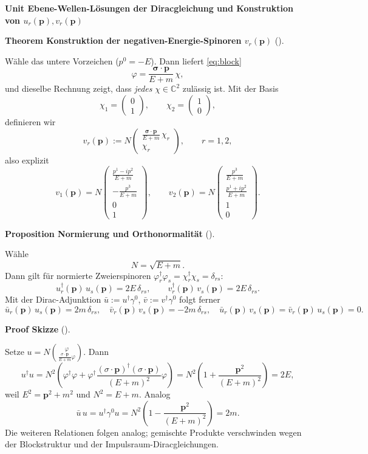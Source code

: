 \documentclass[10pt, letterpaper]{article}
\newcommand{\C}{\mathbb{C}}
\newcommand{\CustomHeading}[3]{%
  \par\medskip\noindent%
  \textbf{#1 #2} \textnormal{(#3)}.\enskip%
}
\newenvironment{PROP}[2]{\begin{unitbox}\CustomHeading{Proposition}{#1}{#2}}{\end{unitbox}}
\newenvironment{THEO}[2]{\begin{unitbox}\CustomHeading{Theorem}{#1}{#2}}{\end{unitbox}}
\newenvironment{PROOF}[2]{\begin{unitbox}\CustomHeading{Proof}{#1}{#2}}{\end{unitbox}}
\newenvironment{unit}[1]
  {\begin{unitbox}\textbf{Unit #1}\par\smallskip}
  {\end{unitbox}}
\begin{document}
\begin{unit}{Ebene-Wellen-Lösungen der Diracgleichung und Konstruktion von $u_r(\mathbf p),v_r(\mathbf p)$}
\begin{THEO}{Konstruktion der negativen-Energie-Spinoren $v_r(\mathbf p)$}{}
Wähle das untere Vorzeichen ($p^0=-E$). Dann liefert \eqref{eq:block}
\[
\varphi=\frac{\boldsymbol{\sigma}\!\cdot\!\mathbf p}{E+m}\,\chi,
\]
und dieselbe Rechnung zeigt, dass \emph{jedes} $\chi\in\C^2$ zulässig ist. Mit der Basis
\[
\chi_1=\begin{pmatrix}0\\1\end{pmatrix},\qquad
\chi_2=\begin{pmatrix}1\\0\end{pmatrix},
\]
definieren wir
\[
v_r(\mathbf p):=N\begin{pmatrix}
\frac{\boldsymbol{\sigma}\!\cdot\!\mathbf p}{E+m}\,\chi_r\\[2pt]\chi_r
\end{pmatrix},
\qquad r=1,2,
\]
also explizit
\[
v_1(\mathbf p)=N\begin{pmatrix}
\frac{p^1-ip^2}{E+m}\\[2pt]-\frac{p^3}{E+m}\\[2pt]0\\[2pt]1
\end{pmatrix},\qquad
v_2(\mathbf p)=N\begin{pmatrix}
\frac{p^3}{E+m}\\[2pt]\frac{p^1+ip^2}{E+m}\\[2pt]1\\[2pt]0
\end{pmatrix}.
\]
\end{THEO}

\begin{PROP}{Normierung und Orthonormalität}{}
Wähle
\[
N=\sqrt{E+m}.
\]
Dann gilt für normierte Zweierspinoren $\varphi_r^\dagger\varphi_s=\chi_r^\dagger\chi_s=\delta_{rs}$:
\[
u_r^\dagger(\mathbf p)\,u_s(\mathbf p)=2E\,\delta_{rs},\qquad
v_r^\dagger(\mathbf p)\,v_s(\mathbf p)=2E\,\delta_{rs}.
\]
Mit der Dirac-Adjunktion $\bar u:=u^\dagger\gamma^0$, $\bar v:=v^\dagger\gamma^0$ folgt ferner
\[
\bar u_r(\mathbf p)\,u_s(\mathbf p)=2m\,\delta_{rs},\quad
\bar v_r(\mathbf p)\,v_s(\mathbf p)=-2m\,\delta_{rs},\quad
\bar u_r(\mathbf p)\,v_s(\mathbf p)=\bar v_r(\mathbf p)\,u_s(\mathbf p)=0.
\]
\end{PROP}

\begin{PROOF}{Skizze}{}
Setze $u=N\binom{\varphi}{\frac{\sigma\cdot\mathbf p}{E+m}\varphi}$.
Dann
\[
u^\dagger u
=N^2\!\left(\varphi^\dagger\varphi + 
\varphi^\dagger\frac{(\sigma\cdot\mathbf p)^\dagger(\sigma\cdot\mathbf p)}{(E+m)^2}\varphi\right)
=N^2\!\left(1+\frac{\mathbf p^2}{(E+m)^2}\right)
=2E,
\]
weil $E^2=\mathbf p^2+m^2$ und $N^2=E+m$. Analog
\[
\bar u\,u = u^\dagger\gamma^0 u 
= N^2\!\left(1-\frac{\mathbf p^2}{(E+m)^2}\right)=2m.
\]
Die weiteren Relationen folgen analog; gemischte Produkte verschwinden wegen der Blockstruktur und der Impulsraum-Diracgleichungen.
\end{PROOF}


\end{unit}
\end{document}
